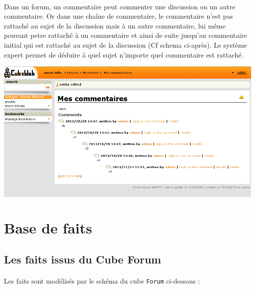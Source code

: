 \documentclass {report}
\begin{document}
\paragraph{}
Dans un forum, un commentaire peut commenter une discussion ou un autre commentaire. Or dans une chaîne de commentaire, le commentaire n'est pas rattaché au sujet de la discussion mais à un autre commentaire, lui même pouvant petre rattaché à un commentaire et ainsi de suite jusqu'au commentaire initial qui est rattaché au sujet de la discussion (Cf schema ci-après). Le système expert permet de déduire à quel sujet n'importe quel commentaire est rattaché.

\begin{center}
\includegraphics[scale=0.7]{comment_chain.png}
\end{center}

\section{Base de faits}

\subsection{Les faits issus du Cube Forum}
\paragraph{}
Les faits sont modélisés par le schéma du cube \verb+Forum+ ci-dessous : 
\end{document}
